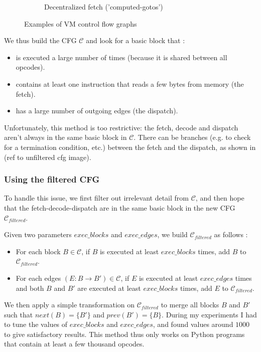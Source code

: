 \documentclass[french]{article}
\begin{document}
\begin{figure}[htp]
\begin{subfigure}{.5\textwidth}
		\caption{Decentralized fetch ('computed-gotos')}
		\label{fig:abstractVM:Decentralized}
	\end{subfigure}
	\caption{Examples of VM control flow graphs}
	\label{fig:abstractVM}
\end{figure}

We thus build the CFG $\mathcal{C}$ and look for a basic block that :
\begin{itemize}
	\item is executed a large number of times (because it is shared between all opcodes).
	\item contains at least one instruction that reads a few bytes from memory (the fetch).
	\item has a large number of outgoing edges (the dispatch).
\end{itemize} 

Unfortunately, this method is too restrictive: the fetch, decode and dispatch aren't always in the same basic block in $\mathcal{C}$. There can be branches (e.g. to check for a termination condition, etc.) between the fetch and the dispatch, as shown in (ref to unfiltered cfg image). 

\subsubsection{Using the filtered CFG}

To handle this issue, we first filter out irrelevant detail from $\mathcal{C}$, and then hope that the fetch-decode-dispatch are in the same basic block in the new CFG $\mathcal{C}_{filtered}$. 

Given two parameters $exec\_blocks$ and $exec\_edges$, we build $\mathcal{C}_{filtered}$ as follows : 
\begin{itemize}
	\item For each block $B \in \mathcal{C}$, if $B$ is executed at least $exec\_blocks$ times, add $B$ to $\mathcal{C}_{filtered}$.
	\item For each edges $(E: B \rightarrow B') \in \mathcal{C}$, if $E$ is executed at least $exec\_edges$ times and both $B$ and $B'$ are executed at least $exec\_blocks$ times, add $E$ to $\mathcal{C}_{filtered}$.
\end{itemize}
We then apply a simple transformation on $\mathcal{C}_{filtered}$ to merge all blocks $B$ and $B'$ such that $next(B) = \{B'\}$ and $prev(B') = \{B\}$. During my experiments I had to tune the values of $exec\_blocks$ and $exec\_edges$, and found values around $1000$ to give satisfactory results. This method thus only works on Python programs that contain at least a few thousand opcodes.
\end{document}
